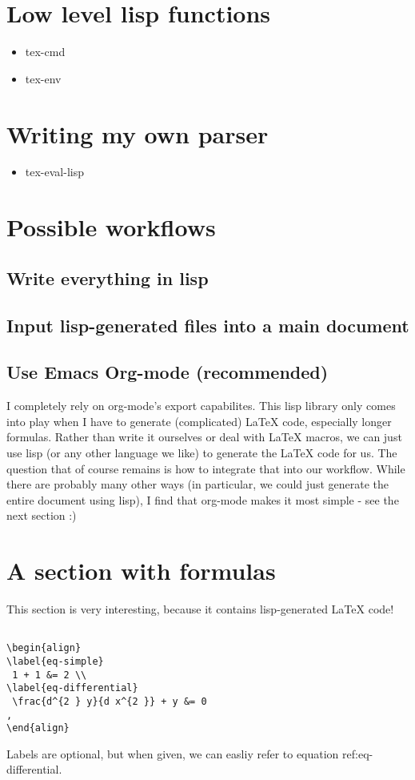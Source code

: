 \documentclass[11pt]{article}
\begin{document}
\section{Low level lisp functions}
\label{sec:org23f9798}
\begin{itemize}
\item tex-cmd
\item tex-env
\end{itemize}

\section{Writing my own parser}
\label{sec:org7090b90}
\begin{itemize}
\item tex-eval-lisp
\end{itemize}

\section{Possible workflows}
\label{sec:orga429763}
\subsection{Write everything in lisp}
\label{sec:orgcb78035}
\subsection{Input lisp-generated files into a main document}
\label{sec:org7400d8b}
\subsection{Use Emacs Org-mode (recommended)}
\label{sec:org58261b6}
I completely rely on org-mode's export capabilites. This lisp library only 
comes into play when I have to generate (complicated) \LaTeX{} code, especially 
longer formulas. Rather than write it ourselves or deal with \LaTeX{} macros,
we can just use lisp (or any other language we like) to generate the \LaTeX{} code 
for us. The question that of course remains is how to integrate that into our workflow. 
While there are probably many other ways (in particular, we could 
just generate the entire document using lisp), I find that org-mode makes it most 
simple - see the next section :)

\section{A section with formulas}
\label{sec:org83d4ae2}
This section is very interesting, because it contains lisp-generated \LaTeX{} code!
\begin{verbatim}

\begin{align}
\label{eq-simple} 
 1 + 1 &= 2 \\
\label{eq-differential} 
 \frac{d^{2 } y}{d x^{2 }} + y &= 0 
,
\end{align}
\end{verbatim}


Labels are optional, but when given, we can easliy refer to equation ref:eq-differential.
\end{document}
